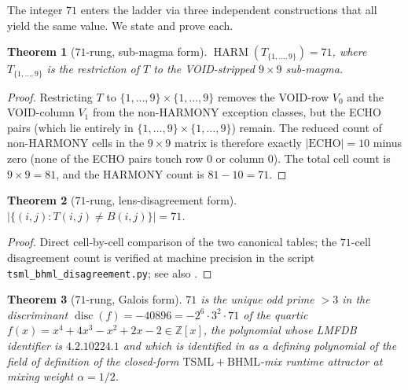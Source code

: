\documentclass[11pt,reqno]{amsart}
\newtheorem{theorem}{Theorem}[section]
\theoremstyle{definition}
\newcommand{\Z}{\mathbb{Z}}
\newcommand{\TSML}{\mathrm{TSML}}
\newcommand{\BHML}{\mathrm{BHML}}
\DeclareMathOperator{\HARM}{HARM}
\DeclareMathOperator{\disc}{disc}
\begin{document}
The integer $71$ enters the ladder via three independent constructions
that all yield the same value. We state and prove each.

\begin{theorem}[$71$-rung, sub-magma form]
\label{thm:71-submagma}
$\HARM(T_{\{1,\ldots,9\}}) = 71$, where
$T_{\{1,\ldots,9\}}$ is the restriction of $T$ to the
VOID-stripped $9 \times 9$ sub-magma.
\end{theorem}

\begin{proof}
Restricting $T$ to $\{1, \ldots, 9\} \times \{1, \ldots, 9\}$
removes the VOID-row $V_0$ and the VOID-column $V_1$ from the
non-HARMONY exception classes, but the ECHO pairs (which lie
entirely in $\{1, \ldots, 9\} \times \{1, \ldots, 9\}$) remain.
The reduced count of non-HARMONY cells in the $9 \times 9$ matrix
is therefore exactly $|\mathrm{ECHO}| = 10$ minus zero (none of
the ECHO pairs touch row $0$ or column $0$). The total cell count
is $9 \times 9 = 81$, and the HARMONY count is
$81 - 10 = 71$.
\end{proof}

\begin{theorem}[$71$-rung, lens-disagreement form]
\label{thm:71-disagree}
$|\{(i, j) : T(i, j) \neq B(i, j)\}| = 71$.
\end{theorem}

\begin{proof}
Direct cell-by-cell comparison of the two canonical tables; the
$71$-cell disagreement count is verified at machine precision in
the script \texttt{tsml\_bhml\_disagreement.py}; see also
\cite{Sanders2026LensInvariance}.
\end{proof}

\begin{theorem}[$71$-rung, Galois form]
\label{thm:71-galois}
\label{subsec:71-galois}
$71$ is the unique odd prime $> 3$ in the discriminant
$\disc(f) = -40896 = -2^{6} \cdot 3^{2} \cdot 71$ of the quartic
$f(x) = x^4 + 4 x^3 - x^2 + 2 x - 2 \in \Z[x]$, the polynomial whose
LMFDB identifier is $4.2.10224.1$ and which is identified in
\cite{Sanders2026Attractor} as a defining polynomial of the field of
definition of the closed-form $\TSML+\BHML$-mix runtime attractor at
mixing weight $\alpha = 1/2$.
\end{theorem}
\end{document}
